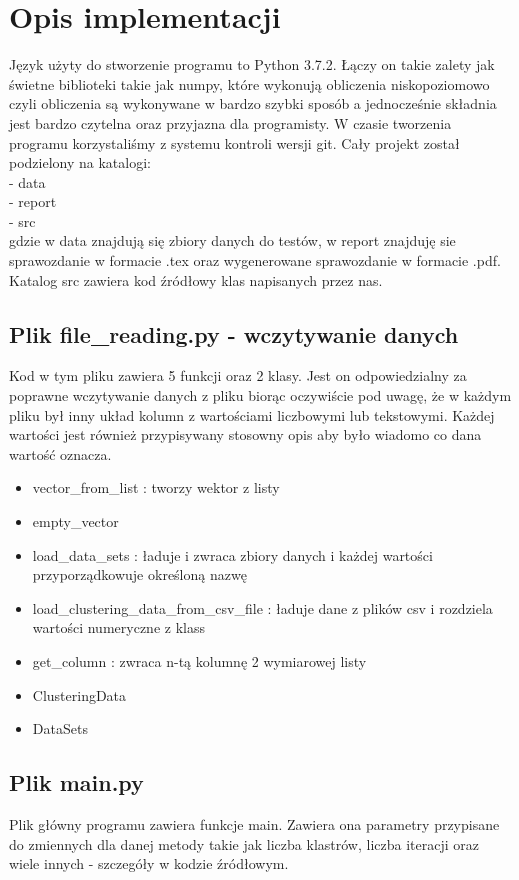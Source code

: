 \documentclass{classrep}
\begin{document}
\section{Opis implementacji}
{Język użyty do stworzenie programu to Python 3.7.2. Łączy on takie zalety jak świetne biblioteki takie jak numpy,
które wykonują obliczenia niskopoziomowo czyli obliczenia są wykonywane w bardzo szybki sposób a jednocześnie składnia
jest bardzo czytelna oraz przyjazna dla programisty. W czasie tworzenia programu korzystaliśmy z systemu kontroli
wersji git. Cały projekt został podzielony na katalogi:\\
- data\\
- report\\
- src\\
gdzie w data znajdują się zbiory danych do testów, w report znajduję sie sprawozdanie w formacie .tex oraz wygenerowane
sprawozdanie w formacie .pdf. Katalog src zawiera kod źródłowy klas napisanych przez nas.
\subsection{Plik file\_reading.py - wczytywanie danych}
{
Kod w tym pliku zawiera 5 funkcji oraz 2 klasy. Jest on odpowiedzialny za poprawne wczytywanie danych z pliku biorąc
oczywiście pod uwagę, że w każdym pliku był inny układ kolumn z wartościami liczbowymi lub tekstowymi. Każdej wartości
jest również przypisywany stosowny opis aby było wiadomo co dana wartość oznacza.
\begin{itemize}
\item vector\_from\_list : tworzy wektor z listy
\item empty\_vector
\item load\_data\_sets : ładuje i zwraca zbiory danych i każdej wartości przyporządkowuje określoną nazwę
\item load\_clustering\_data\_from\_csv\_file : ładuje dane z plików csv i rozdziela wartości numeryczne z klass
\item get\_column : zwraca n-tą kolumnę 2 wymiarowej listy
\item ClusteringData
\item DataSets
\end{itemize}
}
\subsection{Plik main.py}
{
Plik główny programu zawiera funkcje main. Zawiera ona parametry przypisane do zmiennych dla danej metody takie jak
liczba klastrów, liczba iteracji oraz wiele innych - szczegóły w kodzie źródłowym.
}
}
\end{document}
